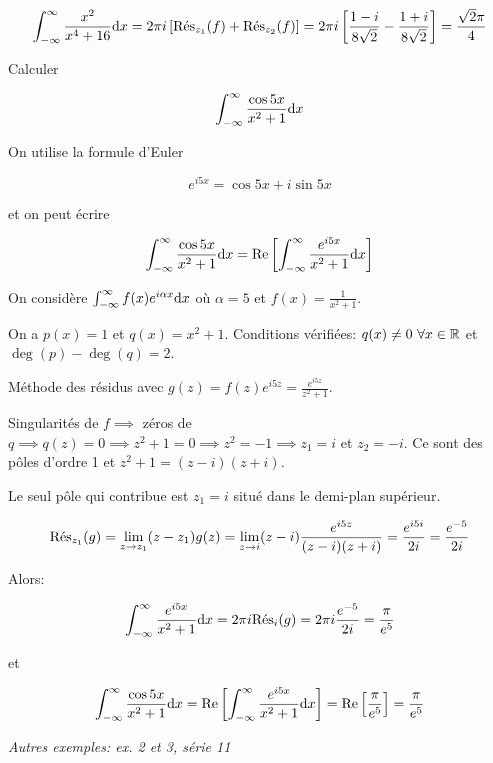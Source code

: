 \begin{enumerate}
\begin{example}[1]
\[
    \int_{-\infty}^\infty \frac{x^2}{x^4 + 16} \dx
    = 2 \pi i \left[ \Res_{z_1}(f) + \Res_{z_2}(f) \right]
    = 2 \pi i \left[ \frac{1 - i}{8\sqrt{2}} - \frac{1 + i}{8\sqrt{2}} \right] = \frac{\sqrt{2}\pi}{4}
\]

\end{example}


\begin{example}[2]
    Calculer
    
    \[ \int_{-\infty}^\infty \frac{\cos 5x}{x^2 + 1} \dx \]
    
    On utilise la formule d'Euler
    
    \[ e^{i5x} = \cos 5x + i \sin 5x \]
    
    et on peut écrire
    
    \[
        \int_{-\infty}^\infty \frac{\cos 5x}{x^2 + 1} \dx
        = \Rep \left[ \int_{-\infty}^\infty \frac{e^{i5x}}{x^2 + 1} \dx \right]
    \]
    
    On considère $\int_{-\infty}^\infty f(x) e^{i\alpha x} \dx$ où $\alpha = 5$ et $f(x) = \frac{1}{x^2 + 1}$.
    
    On a $p(x) = 1$ et $q(x) = x^2 + 1$.
    Conditions vérifiées: $q(x) \neq 0 \ \forall x \in \R$ et $\deg(p) - \deg(q) = 2$.
    
    Méthode des résidus avec $g(z) = f(z) e^{i5z} = \frac{e^{i5z}}{z^2 + 1}$.
    
    Singularités de $f \implies$ zéros de $q \implies q(z) = 0 \implies z^2 + 1 = 0 \implies z^2 = -1 \implies z_1 = i$ et $z_2 = -i$.
    Ce sont des pôles d'ordre 1 et $z^2 + 1 = (z - i)(z + i)$.
    
    Le seul pôle qui contribue est $z_1 = i$ situé dans le demi-plan supérieur.
    
    \[
        \Res_{z_1}(g)
        = \lim_{z \rightarrow z_1} (z - z_1) g(z)
        = \lim_{z \rightarrow i} (z - i) \frac{e^{i5z}}{(z - i)(z + i)}
        = \frac{e^{i5i}}{2i}
        = \frac{e^{-5}}{2i}
    \]
    
    Alors:
    
    \[
        \int_{-\infty}^\infty \frac{e^{i5x}}{x^2 + 1} \dx = 2\pi i \Res_i (g) = 2\pi i \frac{e^{-5}}{2i} = \frac{\pi}{e^{5}}
    \]
    
    et
    
    \[
        \int_{-\infty}^\infty \frac{\cos 5x}{x^2 + 1} \dx
        = \Rep \left[ \int_{-\infty}^\infty \frac{e^{i5x}}{x^2 + 1} \dx \right]
        = \Rep \left[ \frac{\pi}{e^{5}} \right]
        = \frac{\pi}{e^{5}}
    \]
    
    \textit{Autres exemples: ex. 2 et 3, série 11}
\end{example}

\end{enumerate}

